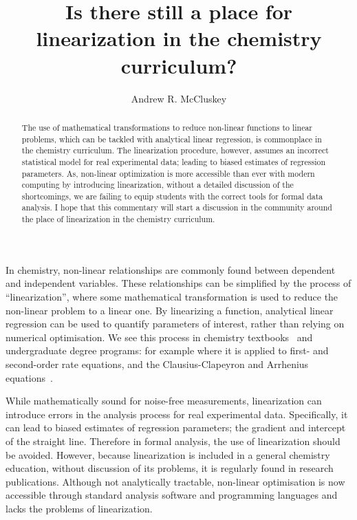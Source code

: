 \documentclass[journal=jceda8,manuscript=article]{achemso}
\author{Andrew R. McCluskey}
\affiliation{European Spallation Source ERIC, Ole Maaløes vej 3, 2200 København N, DK}
\title{Is there still a place for linearization in the chemistry curriculum?}
\begin{document}
\begin{abstract}
    The use of mathematical transformations to reduce non-linear functions to linear problems, which can be tackled with analytical linear regression, is commonplace in the chemistry curriculum. 
    The linearization procedure, however, assumes an incorrect statistical model for real experimental data; leading to biased estimates of regression parameters. 
    As, non-linear optimization is more accessible than ever with modern computing by introducing linearization, without a detailed discussion of the shortcomings, we are failing to equip students with the correct tools for formal data analysis. 
    I hope that this commentary will start a discussion in the community around the place of linearization in the chemistry curriculum. 
\end{abstract}

\maketitle 

In chemistry, non-linear relationships are commonly found between dependent and independent variables.
These relationships can be simplified by the process of ``linearization'', where some mathematical transformation is used to reduce the non-linear problem to a linear one. 
By linearizing a function, analytical linear regression can be used to quantify parameters of interest, rather than relying on numerical optimisation. 
We see this process in chemistry textbooks~\cite{monk_math_2010,atkins_physical_2018} and undergraduate degree programs: for example where it is applied to first- and second-order rate equations, and the Clausius-Clapeyron and Arrhenius equations~\cite{perrin_linear_2017,harper_data_2017,monk_math_2010}.

While mathematically sound for noise-free measurements, linearization can introduce errors in the analysis process for real experimental data. 
Specifically, it can lead to biased estimates of regression parameters; the gradient and intercept of the straight line.
Therefore in formal analysis, the use of linearization should be avoided. 
However, because linearization is included in a general chemistry education, without discussion of its problems, it is regularly found in research publications. 
Although not analytically tractable, non-linear optimisation is now accessible through standard analysis software and programming languages and lacks the problems of linearization. 
\end{document}
